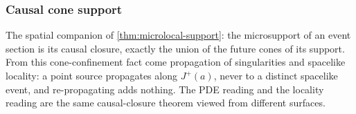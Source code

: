 \subsubsection{Causal cone support}

\begin{theorem}\label{thm:causal-microsupport}\leanok{}
The spatial companion of \cref{thm:microlocal-support}: the microsupport of an
event section is its causal closure, exactly the union of the future cones of
its support. From this cone-confinement fact come propagation of singularities
and spacelike locality: a point source propagates along $J^+(a)$, never to a
distinct spacelike event, and re-propagating adds nothing. The PDE reading and
the locality reading are the same causal-closure theorem viewed from different
surfaces.
\end{theorem}
